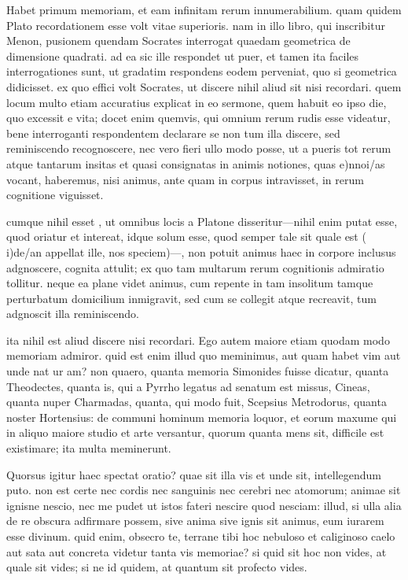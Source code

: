 Habet primum memoriam, et eam infinitam rerum innumerabilium. quam quidem Plato recordationem esse volt vitae superioris. nam in illo libro, qui inscribitur Menon, pusionem quendam Socrates interrogat quaedam geometrica de dimensione quadrati. ad ea sic ille respondet ut puer, et tamen ita faciles interrogationes sunt, ut gradatim respondens eodem perveniat, quo si geometrica didicisset. ex quo effici volt Socrates, ut discere nihil aliud sit nisi recordari. quem locum multo etiam accuratius explicat in eo sermone, quem habuit eo ipso die, quo excessit e vita; docet enim quemvis, qui omnium rerum rudis esse videatur, bene interroganti respondentem declarare se non tum illa discere, sed reminiscendo recognoscere, nec vero fieri ullo modo posse, ut a pueris tot rerum atque tantarum insitas et quasi consignatas in animis notiones, quas e)nnoi/as vocant, haberemus, nisi animus, ante quam in corpus intravisset, in rerum cognitione viguisset.

 cumque nihil esset , ut omnibus locis a Platone disseritur—nihil enim putat esse, quod oriatur et intereat, idque solum esse, quod semper tale sit quale est ( i)de/an appellat ille, nos speciem)—, non potuit animus haec in corpore inclusus adgnoscere, cognita attulit; ex quo tam multarum rerum cognitionis admiratio tollitur. neque ea plane videt animus, cum repente in tam insolitum tamque perturbatum domicilium inmigravit, sed cum se collegit atque recreavit, tum adgnoscit illa reminiscendo.

 ita nihil est aliud discere nisi recordari. Ego autem maiore etiam quodam modo memoriam admiror. quid est enim illud quo meminimus, aut quam habet vim aut unde nat ur am? non quaero, quanta memoria Simonides fuisse dicatur, quanta Theodectes, quanta is, qui a Pyrrho legatus ad senatum est missus, Cineas, quanta nuper Charmadas, quanta, qui modo fuit, Scepsius Metrodorus, quanta noster Hortensius: de communi hominum memoria loquor, et eorum maxume qui in aliquo maiore studio et arte versantur, quorum quanta mens sit, difficile est existimare; ita multa meminerunt.

 Quorsus igitur haec spectat oratio? quae sit illa vis et unde sit, intellegendum puto. non est certe nec cordis nec sanguinis nec cerebri nec atomorum; animae sit ignisne nescio, nec me pudet ut istos fateri nescire quod nesciam: illud, si ulla alia de re obscura adfirmare possem, sive anima sive ignis sit animus, eum iurarem esse divinum. quid enim, obsecro te, terrane tibi hoc nebuloso et caliginoso caelo aut sata aut concreta videtur tanta vis memoriae? si quid sit hoc non vides, at quale sit vides; si ne id quidem, at quantum sit profecto vides.

